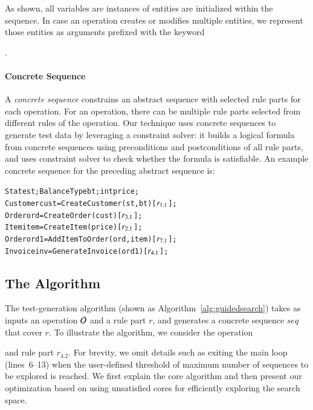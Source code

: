 As shown, all variables are instances of entities are initialized within the sequence.
In case an operation creates or modifies multiple entities,
we represent those entities as arguments prefixed with the keyword \subject{out}. 

\vskip -7pt
\paragraph*{Concrete Sequence} A \textit{concrete sequence} constrains an
abstract sequence with selected rule parts for each operation. For an operation,
there can be multiple rule parts selected from different rules of the
operation. Our technique uses concrete sequences to generate test data by
leveraging a constraint solver: it builds a logical formula from concrete
sequences using preconditions and postconditions of all rule parts, and uses
constraint solver to check whether the formula is satisfiable. An example
concrete sequence for the preceding abstract sequence is:

\vspace*{-4pt}
{\scriptsize
\begin{alltt} 
 State st; BalanceType bt; int price;
 Customer cust = CreateCustomer(st, bt) [\(r\sb{1.1}\)];
 Order ord = CreateOrder(cust) [\(r\sb{3.1}\)];	
 Item item = CreateItem(price) [\(r\sb{2.1}\)];
 Order ord1 = AddItemToOrder(ord, item) [\(r\sb{7.1}\)];
 Invoice inv = GenerateInvoice(ord1) [\(r\sb{4.1}\)];  
\end{alltt}
}
\vspace*{-5pt}

\subsection{The Algorithm}
\label{sec:technique}

The test-generation algorithm (shown as Algorithm~\ref{alg:guidedsearch}) takes
as inputs an operation ${\cal O}$ and a rule part $r$, and generates a concrete
sequence $seq$ that cover $r$. To illustrate the algorithm, we consider the
operation \subject{GenerateInvoice} and rule part $r_{4.2}$. For brevity, we
omit details such as exiting the main loop (lines~6--13) when the user-defined
threshold of maximum number of sequences to be explored is reached. We first
explain the core algorithm and then present our optimization based on using
unsatisfied cores for efficiently exploring the search space.

